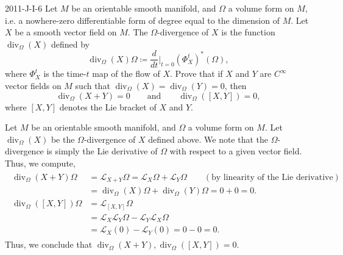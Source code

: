 \documentclass{article}
\begin{document}
	\begin{prb}{2011-J-I-6}
		Let $M$ be an orientable smooth manifold, and $\Omega$ a volume form on $M$, i.e. a nowhere-zero differentiable form of degree equal to the dimension of $M$. Let $X$ be a smooth vector field on $M$. The $\Omega$-divergence of $X$ is the function $\operatorname{div}_{\Omega}(X)$ defined by 
		\begin{equation*}
			\operatorname{div}_{\Omega}(X)\Omega \coloneqq \frac{d}{dt}\bigg|_{t = 0}(\Phi^{t}_{X})^{\ast}(\Omega), 
		\end{equation*}
		where $\Phi^{t}_{X}$ is the time-$t$ map of the flow of $X$. Prove that if $X$ and $Y$ are $C^{\infty}$ vector fields on $M$ such that $\operatorname{div}_{\Omega}(X) = \operatorname{div}_{\Omega}(Y) = 0$, then 
		\begin{equation*}
			\operatorname{div}_{\Omega}(X + Y) = 0 \qquad \text{and}\qquad \operatorname{div}_{\Omega}([X,Y]) = 0, 
		\end{equation*}
		where $[X,Y]$ denotes the Lie bracket of $X$ and $Y$. 
	\end{prb}
	Let $M$ be an orientable smooth manifold, and $\Omega$ a volume form on $M$. Let $\operatorname{div}_{\Omega}(X)$ be the $\Omega$-divergence of $X$ defined above. We note that the $\Omega$-divergence is simply the Lie derivative of $\Omega$ with respect to a given vector field. Thus, we compute, 
	\begin{align*}
		\begin{split}
			\operatorname{div}_{\Omega}(X + Y)\Omega &= \mathcal{L}_{X + Y}\Omega = \mathcal{L}_{X}\Omega + \mathcal{L}_{Y}\Omega \qquad (\text{by linearity of the Lie derivative})\\
			&= \operatorname{div}_{\Omega}(X)\Omega + \operatorname{div}_{\Omega}(Y)\Omega = 0 + 0 = 0.  \\
			\operatorname{div}_{\Omega}([X,Y])\Omega &= \mathcal{L}_{[X,Y]}\Omega \\
			&= \mathcal{L}_{X}\mathcal{L}_{Y}\Omega - \mathcal{L}_{Y}\mathcal{L}_{X}\Omega \\
			&= \mathcal{L}_{X}(0) - \mathcal{L}_{Y}(0) =0 - 0 = 0. 
		\end{split}
	\end{align*}
	Thus, we conclude that $\operatorname{div}_{\Omega}(X + Y), \operatorname{div}_{\Omega}([X,Y]) =0$. 
	
\end{document}
